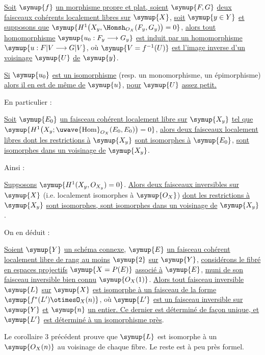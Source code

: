  \uline{Soit} $\symup{f}$ \uline{un morphisme propre et plat, soient} $\symup{F,G}$ \uline{deux
faisceaux cohérents localement libres sur} $\symup{X}$, \uline{soit} $\symup{y\in Y}$ \uline{et supposons que}
$\symup{H^1\bigl(X_y,\Homsh_{O_X}(F_y,G_y)\bigr)=0}$,
\uline{alors tout homomorphisme} $\symup{u_0:F_y\longrightarrow G_y}$ \uline{est induit par un
homomorphisme} $\symup{u:F|V\longrightarrow G|V}$, où $\symup{V=f^{-1}(U)}$ \uline{est l'image inverse d'un voisinage} $\symup{U}$ \uline{de} $\symup{y}$.

 \uline{Si} $\symup{u_0}$ \uline{est un isomorphisme} (resp. un monomorphisme, un
épimorphisme) \uline{alors il en est de même de} $\symup{u}$, \uline{pour} $\symup{U}$ \uline{assez petit.}

En particulier :

 \uline{Soit} $\symup{E_0}$ \uline{un faisceau cohérent localement libre sur}
$\symup{X_y}$ \uline{tel que}
$\symup{H^1\bigl(X_y;\mathop{\text{\uwave{Hom}}}\nolimits_{O_X}(E_0,E_0)\bigr)=0}$,
\uline{alors deux faisceaux localement libres dont les restrictions à} $\symup{X_y}$ \uline{sont
isomorphes à} $\symup{E_0}$, \uline{sont isomorphes dans un voisinage de} $\symup{X_y}$.

Ainsi :

 \uline{Supposons} $\symup{H^1(X_y,O_{X_y})=0}$. \uline{Alors deux faisceaux
inversibles sur} $\symup{X}$ (i.e. localement isomorphes à $\symup{O_X}$) \uline{dont les
restrictions à} $\symup{X_y}$ \uline{sont isomorphes, sont isomorphes dans un voisinage de} $\symup{X_y}$.

On en déduit :

 \uline{Soient} $\symup{Y}$ \uline{un schéma connexe}, $\symup{E}$ \uline{un faisceau cohérent localement libre de rang au moins} $\symup{2}$ \uline{sur} $\symup{Y}$, \uline{considérons le fibré en espaces projectifs}
$\symup{X=P(E)}$ \uline{associé à} $\symup{E}$, \uline{muni de son faisceau inversible bien connu}
$\symup{O_X(1)}$. \uline{Alors tout faisceau inversible} $\symup{L}$ \uline{sur} $\symup{X}$ \uline{est isomorphe à un
faisceau de la forme}
$\symup{f^*(L')\otimesO_X(n)}$,
où $\symup{L'}$ \uline{est un faisceau inversible sur} $\symup{Y}$ \uline{et} $\symup{n}$ \uline{un entier. Ce dernier est
déterminé de façon unique, et} $\symup{L'}$ \uline{est déterminé à un isomorphisme près}.

Le corollaire 3 précédent prouve que $\symup{L}$ est isomorphe à un $\symup{O_X(n)}$ au
voisinage de chaque fibre. Le reste est à peu près formel.

